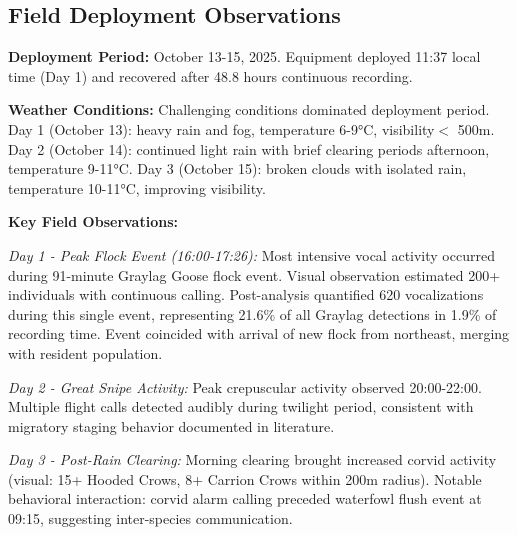 \documentclass[twocolumn]{article}
\begin{document}
\subsection{Field Deployment Observations}

\textbf{Deployment Period:} October 13-15, 2025. Equipment deployed 11:37 local time (Day 1) and recovered after 48.8 hours continuous recording.

\textbf{Weather Conditions:} Challenging conditions dominated deployment period. Day 1 (October 13): heavy rain and fog, temperature 6-9°C, visibility$<$ 500m. Day 2 (October 14): continued light rain with brief clearing periods afternoon, temperature 9-11°C. Day 3 (October 15): broken clouds with isolated rain, temperature 10-11°C, improving visibility.

\textbf{Key Field Observations:}

\textit{Day 1 - Peak Flock Event (16:00-17:26):} Most intensive vocal activity occurred during 91-minute Graylag Goose flock event. Visual observation estimated 200+ individuals with continuous calling. Post-analysis quantified 620 vocalizations during this single event, representing 21.6\% of all Graylag detections in 1.9\% of recording time. Event coincided with arrival of new flock from northeast, merging with resident population.

\textit{Day 2 - Great Snipe Activity:} Peak crepuscular activity observed 20:00-22:00. Multiple flight calls detected audibly during twilight period, consistent with migratory staging behavior documented in literature.

\textit{Day 3 - Post-Rain Clearing:} Morning clearing brought increased corvid activity (visual: 15+ Hooded Crows, 8+ Carrion Crows within 200m radius). Notable behavioral interaction: corvid alarm calling preceded waterfowl flush event at 09:15, suggesting inter-species communication.
\end{document}
